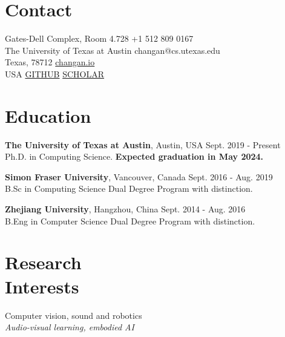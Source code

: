 \documentclass[margin, 10pt]{res} %
\begin{document}
\begin{resume}


\section{Contact} 

Gates-Dell Complex, Room 4.728 \hfill +1 512 809 0167 \\
The University of Texas at Austin \hfill changan@cs.utexas.edu \\
Texas, 78712 \hfill \hyperlink{changan.io}{changan.io} \\
USA \hfill \href{https://github.com/changanvr}{GITHUB} \href{https://scholar.google.com/citations?user=9Uxf0ikAAAAJ&hl=en}{SCHOLAR}

\section{Education} 
\textbf{The University of Texas at Austin}, Austin, USA \hfill Sept. 2019 - Present \\
Ph.D. in Computing Science. \textbf{Expected graduation in May 2024.}

\textbf{Simon Fraser University}, Vancouver, Canada \hfill Sept. 2016 - Aug. 2019 \\
B.Sc in Computing Science Dual Degree Program with distinction. 

\textbf{Zhejiang University}, Hangzhou, China \hfill Sept. 2014 - Aug. 2016 \\
B.Eng in Computer Science Dual Degree Program with distinction. 

\section{Research \\ Interests}
Computer vision, sound and robotics \\ 
\textit{Audio-visual learning, embodied AI}


\end{resume}
\end{document}
